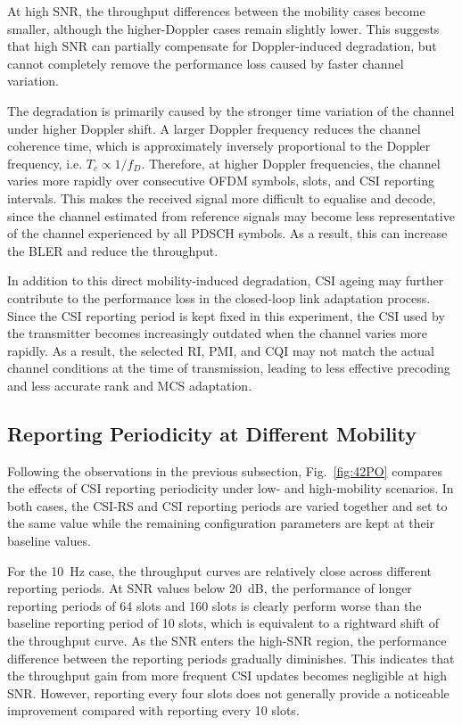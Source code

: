 \documentclass[a4paper,12pt,onecolumn]{article}
\begin{document}
		At high SNR, the throughput differences between the mobility cases become smaller, although the higher-Doppler cases remain slightly lower. This suggests that high SNR can partially compensate for Doppler-induced degradation, but cannot completely remove the performance loss caused by faster channel variation.

		The degradation is primarily caused by the stronger time variation of the channel under higher Doppler shift. A larger Doppler frequency reduces the channel coherence time, which is approximately inversely proportional to the Doppler frequency, i.e. \(T_c \propto 1/f_D\). Therefore, at higher Doppler frequencies, the channel varies more rapidly over consecutive OFDM symbols, slots, and CSI reporting intervals. This makes the received signal more difficult to equalise and decode, since the channel estimated from reference signals may become less representative of the channel experienced by all PDSCH symbols. As a result, this can increase the BLER and reduce the throughput.
		
		In addition to this direct mobility-induced degradation, CSI ageing may further contribute to the performance loss in the closed-loop link adaptation process. Since the CSI reporting period is kept fixed in this experiment, the CSI used by the transmitter becomes increasingly outdated when the channel varies more rapidly. As a result, the selected RI, PMI, and CQI may not match the actual channel conditions at the time of transmission, leading to less effective precoding and less accurate rank and MCS adaptation.


	\subsection{Reporting Periodicity at Different Mobility}
	
	\label{sec:5.2}
			Following the observations in the previous subsection, Fig.~\ref{fig:42PO} compares the effects of CSI reporting periodicity under low- and high-mobility scenarios. In both cases, the CSI-RS and CSI reporting periods are varied together and set to the same value while the remaining configuration parameters are kept at their baseline values.
			
			For the 10~Hz case, the throughput curves are relatively close across different reporting periods. At SNR values below 20~dB, the performance of longer reporting periods of 64 slots and 160 slots is clearly perform worse than the baseline reporting period of 10 slots, which is equivalent to a rightward shift of the throughput curve. As the SNR enters the high-SNR region, the performance difference between the reporting periods gradually diminishes. This indicates that the throughput gain from more frequent CSI updates becomes negligible at high SNR. However, reporting every four slots does not generally provide a noticeable
			improvement compared with reporting every 10 slots.
			
\end{document}
